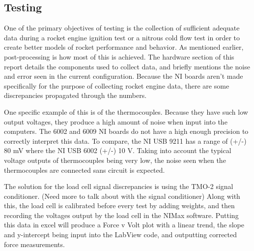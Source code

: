 \documentclass[10pt,a4paper]{article}
\begin{document}
\subsection{Testing}

\par One of the primary objectives of testing is the collection of sufficient adequate data during a rocket engine ignition test or a nitrous cold flow test in order to create better models of rocket performance and behavior. As mentioned earlier, post-processing is how most of this is achieved. The hardware section of this report details the components used to collect data, and briefly mentions the noise and error seen in the current configuration. Because the NI boards aren't made specifically for the purpose of collecting rocket engine data, there are some discrepancies propagated through the numbers. 
\par One specific example of this is of the thermocouples. Because they have such low output voltages, they produce a high amount of noise when input into the computers. The 6002 and 6009 NI boards do not have a high enough precision to correctly interpret this data. To compare, the NI USB 9211 has a range of (+/-) 80 mV where the NI USB 6002 (+/-) 10 V. Taking into account the typical voltage outputs of thermocouples being very low, the noise seen when the thermocouples are connected sans circuit is expected. 
\par The solution for the load cell signal discrepancies is using the TMO-2 signal conditioner. (Need more to talk about with the signal conditioner) Along with this, the load cell is calibrated before every test by adding weights, and then recording the voltages output by the load cell in the NIMax software. Putting this data in excel will produce a Force v Volt plot with a linear trend, the slope and y-intercept being input into the LabView code, and outputting corrected force measurements.
\end{document}
